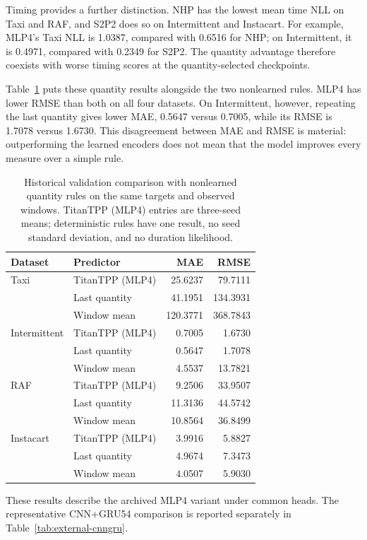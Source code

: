 \documentclass[runningheads]{llncs}
\begin{document}
Timing provides a further distinction. NHP has the lowest mean time NLL on Taxi and RAF, and S2P2 does so on Intermittent and Instacart. For example, MLP4's Taxi NLL is 1.0387, compared with 0.6516 for NHP; on Intermittent, it is 0.4971, compared with 0.2349 for S2P2. The quantity advantage therefore coexists with worse timing scores at the quantity-selected checkpoints.

Table~\ref{tab:external-simple} puts these quantity results alongside the two nonlearned rules. MLP4 has lower RMSE than both on all four datasets. On Intermittent, however, repeating the last quantity gives lower MAE, 0.5647 versus 0.7005, while its RMSE is 1.7078 versus 1.6730. This disagreement between MAE and RMSE is material: outperforming the learned encoders does not mean that the model improves every measure over a simple rule.

\begin{table}[t]
\caption{Historical validation comparison with nonlearned quantity rules on the same targets and observed windows. TitanTPP (MLP4) entries are three-seed means; deterministic rules have one result, no seed standard deviation, and no duration likelihood.}
\label{tab:external-simple}\centering\small
\begin{tabular}{llrr}
\toprule
Dataset & Predictor & MAE & RMSE\\
\midrule
Taxi & TitanTPP (MLP4) & 25.6237 & 79.7111\\
 & Last quantity & 41.1951 & 134.3931\\
 & Window mean & 120.3771 & 368.7843\\
\midrule
Intermittent & TitanTPP (MLP4) & 0.7005 & 1.6730\\
 & Last quantity & 0.5647 & 1.7078\\
 & Window mean & 4.5537 & 13.7821\\
\midrule
RAF & TitanTPP (MLP4) & 9.2506 & 33.9507\\
 & Last quantity & 11.3136 & 44.5742\\
 & Window mean & 10.8564 & 36.8499\\
\midrule
Instacart & TitanTPP (MLP4) & 3.9916 & 5.8827\\
 & Last quantity & 4.9674 & 7.3473\\
 & Window mean & 4.0507 & 5.9030\\
\bottomrule
\end{tabular}
\end{table}


These results describe the archived MLP4 variant under common heads. The representative CNN+GRU54 comparison is reported separately in Table~\ref{tab:external-cnngru}.
\end{document}
